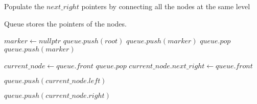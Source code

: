 \documentclass[12pt]{article}
\begin{document}
\begin{algorithm}

  \caption{Populate the $next\_right$ pointers by connecting all the nodes at the same level}
  \begin{algorithmic}[1]
    \Statex
        \LeftComment Queue stores the pointers of the nodes.
        
        \Statex
            \State \Return{}
        \EndIf
        
        \Statex
        \State $marker \gets nullptr$
        \State $queue.push(root)$
        \State $queue.push(marker)$
                \State $queue.pop$
                    \State $queue.push(marker)$
                \EndIf
            \EndIf
            
            \State $current\_node\gets queue.front $
            \State $queue.pop$
            \State $current\_node.next\_right \gets queue.front$ 
            
                \State $queue.push(current\_node.left)$
            \EndIf
            
                \State $queue.push(current\_node.right)$
            \EndIf
            
        \EndWhile

    \EndFunction
  \end{algorithmic}
  
\end{algorithm}
\end{document}
